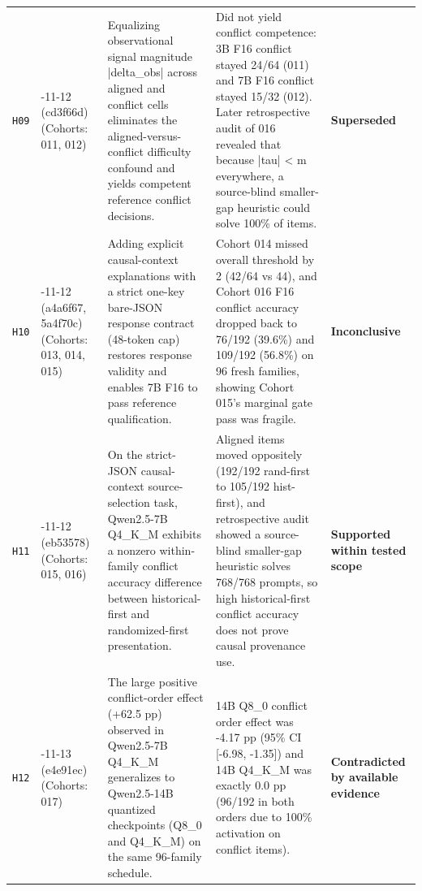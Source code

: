 {\begin{longtable}{@{}>{\raggedright\arraybackslash}p{0.9cm}>{\raggedright\arraybackslash}p{1.9cm}>{\raggedright\arraybackslash}p{4.3cm}>{\raggedright\arraybackslash}p{4.6cm}>{\raggedright\arraybackslash}p{2.7cm}@{}}
\texttt{H09} & 2026-\allowbreak{}11-\allowbreak{}12 (cd3f66d) (Cohorts: 011, 012) & Equalizing observational signal magnitude |delta\_obs| across aligned and conflict cells eliminates the aligned-\allowbreak{}versus-\allowbreak{}conflict difficulty confound and yields competent reference conflict decisions. & Did not yield conflict competence: 3B F16 conflict stayed 24/\allowbreak{}64 (011) and 7B F16 conflict stayed 15/\allowbreak{}32 (012). Later retrospective audit of 016 revealed that because |tau| < m everywhere, a source-\allowbreak{}blind smaller-\allowbreak{}gap heuristic could solve 100\% of items. & \textbf{Superseded} \\[2pt]
\texttt{H10} & 2026-\allowbreak{}11-\allowbreak{}12 (a4a6f67, 5a4f70c) (Cohorts: 013, 014, 015) & Adding explicit causal-\allowbreak{}context explanations with a strict one-\allowbreak{}key bare-\allowbreak{}JSON response contract (48-\allowbreak{}token cap) restores response validity and enables 7B F16 to pass reference qualification. & Cohort 014 missed overall threshold by 2 (42/\allowbreak{}64 vs 44), and Cohort 016 F16 conflict accuracy dropped back to 76/\allowbreak{}192 (39.6\%) and 109/\allowbreak{}192 (56.8\%) on 96 fresh families, showing Cohort 015's marginal gate pass was fragile. & \textbf{Inconclusive} \\[2pt]
\texttt{H11} & 2026-\allowbreak{}11-\allowbreak{}12 (eb53578) (Cohorts: 015, 016) & On the strict-\allowbreak{}JSON causal-\allowbreak{}context source-\allowbreak{}selection task, Qwen2.5-\allowbreak{}7B Q4\_K\_M exhibits a nonzero within-\allowbreak{}family conflict accuracy difference between historical-\allowbreak{}first and randomized-\allowbreak{}first presentation. & Aligned items moved oppositely (192/\allowbreak{}192 rand-\allowbreak{}first to 105/\allowbreak{}192 hist-\allowbreak{}first), and retrospective audit showed a source-\allowbreak{}blind smaller-\allowbreak{}gap heuristic solves 768/\allowbreak{}768 prompts, so high historical-\allowbreak{}first conflict accuracy does not prove causal provenance use. & \textbf{Supported within tested scope} \\[2pt]
\texttt{H12} & 2026-\allowbreak{}11-\allowbreak{}13 (e4e91ec) (Cohorts: 017) & The large positive conflict-\allowbreak{}order effect (+62.5 pp) observed in Qwen2.5-\allowbreak{}7B Q4\_K\_M generalizes to Qwen2.5-\allowbreak{}14B quantized checkpoints (Q8\_0 and Q4\_K\_M) on the same 96-\allowbreak{}family schedule. & 14B Q8\_0 conflict order effect was -\allowbreak{}4.17 pp (95\% CI [-\allowbreak{}6.98, -\allowbreak{}1.35]) and 14B Q4\_K\_M was exactly 0.0 pp (96/\allowbreak{}192 in both orders due to 100\% activation on conflict items). & \textbf{Contradicted by available evidence} \\[2pt]

\end{longtable}}
